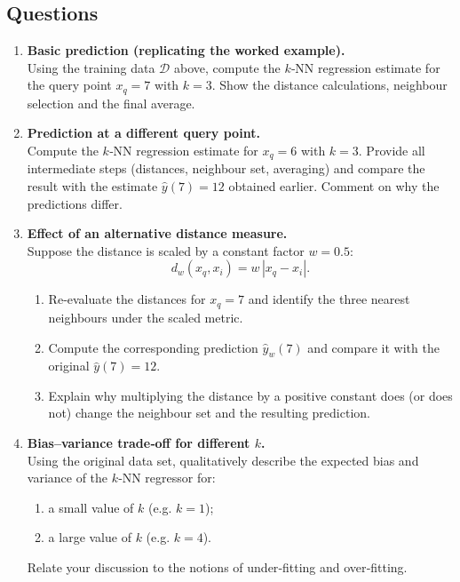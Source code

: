 \documentclass[12pt, a4paper]{article}
\begin{document}
\subsection{Questions}
\begin{enumerate}
  \item \textbf{Basic prediction (replicating the worked example).}\\
  Using the training data \(\mathcal{D}\) above, compute the $k$‑NN regression
  estimate for the query point \(x_q=7\) with \(k=3\).  Show the distance
  calculations, neighbour selection and the final average.

  \item \textbf{Prediction at a different query point.}\\
  Compute the $k$‑NN regression estimate for \(x_q=6\) with \(k=3\).  
  Provide all intermediate steps (distances, neighbour set, averaging) and
  compare the result with the estimate \(\hat y(7)=12\) obtained earlier.
  Comment on why the predictions differ.

  \item \textbf{Effect of an alternative distance measure.}\\
  Suppose the distance is scaled by a constant factor \(w=0.5\):
  \[
  d_w(x_q,x_i)=w\,|x_q-x_i|.
  \]
  \begin{enumerate}
    \item Re‑evaluate the distances for \(x_q=7\) and identify the three nearest
          neighbours under the scaled metric.
    \item Compute the corresponding prediction \(\hat y_w(7)\) and compare it
          with the original \(\hat y(7)=12\).
    \item Explain why multiplying the distance by a positive constant does
          (or does not) change the neighbour set and the resulting prediction.
  \end{enumerate}

  \item \textbf{Bias–variance trade‑off for different \(k\).}\\
  Using the original data set, qualitatively describe the expected
  bias and variance of the $k$‑NN regressor for:
  \begin{enumerate}
    \item a small value of \(k\) (e.g. \(k=1\));
    \item a large value of \(k\) (e.g. \(k=4\)).
  \end{enumerate}
  Relate your discussion to the notions of under‑fitting and over‑fitting.


\end{enumerate}
\end{document}
